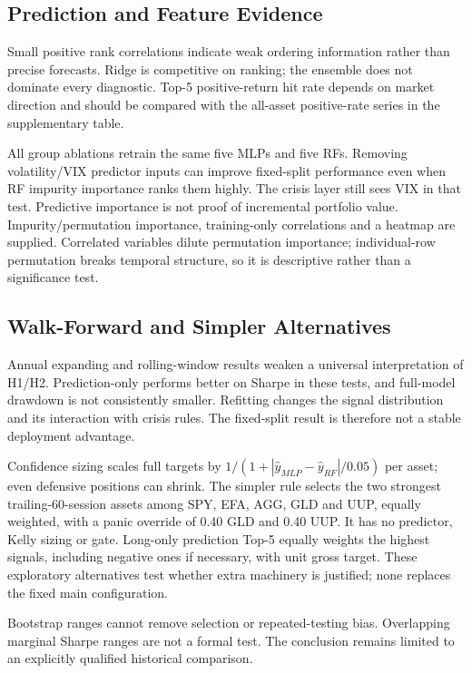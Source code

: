 \documentclass[3p,times]{elsarticle}
\newcommand{\resulttable}[1]{}
\begin{document}
\subsection{Prediction and Feature Evidence}
\resulttable{prediction}
Small positive rank correlations indicate weak ordering information rather than precise forecasts. Ridge is competitive on ranking; the ensemble does not dominate every diagnostic. Top-5 positive-return hit rate depends on market direction and should be compared with the all-asset positive-rate series in the supplementary table.
\resulttable{features-ablation}
All group ablations retrain the same five MLPs and five RFs. Removing volatility/VIX predictor inputs can improve fixed-split performance even when RF impurity importance ranks them highly. The crisis layer still sees VIX in that test. Predictive importance is not proof of incremental portfolio value. Impurity/permutation importance, training-only correlations and a heatmap are supplied. Correlated variables dilute permutation importance; individual-row permutation breaks temporal structure, so it is descriptive rather than a significance test.

\subsection{Walk-Forward and Simpler Alternatives}
\resulttable{walk-forward}
Annual expanding and rolling-window results weaken a universal interpretation of H1/H2. Prediction-only performs better on Sharpe in these tests, and full-model drawdown is not consistently smaller. Refitting changes the signal distribution and its interaction with crisis rules. The fixed-split result is therefore not a stable deployment advantage.
\resulttable{advanced}
Confidence sizing scales full targets by $1/(1+|\widehat y_{MLP}-\widehat y_{RF}|/0.05)$ per asset; even defensive positions can shrink. The simpler rule selects the two strongest trailing-60-session assets among SPY, EFA, AGG, GLD and UUP, equally weighted, with a panic override of 0.40 GLD and 0.40 UUP. It has no predictor, Kelly sizing or gate. Long-only prediction Top-5 equally weights the highest signals, including negative ones if necessary, with unit gross target. These exploratory alternatives test whether extra machinery is justified; none replaces the fixed main configuration.
\resulttable{bootstrap}
Bootstrap ranges cannot remove selection or repeated-testing bias. Overlapping marginal Sharpe ranges are not a formal test. The conclusion remains limited to an explicitly qualified historical comparison.
\FloatBarrier
\end{document}

